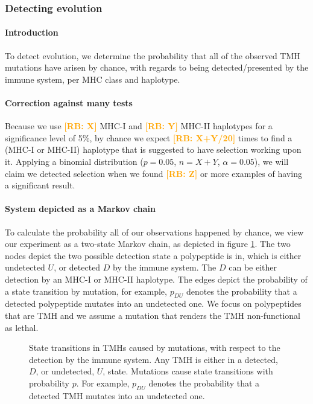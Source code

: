 \documentclass{article}
\newcommand{\richel}[1]{\textcolor{orange}{\textbf{[RB: #1]}}}
\begin{document}
\subsubsection{Detecting evolution}

\paragraph{Introduction}

To detect evolution, we determine the probability 
that all of the observed TMH mutations have arisen by chance,
with regards to being detected/presented by the immune system,
per MHC class and haplotype.

\paragraph{Correction against many tests}

Because we use \richel{X} MHC-I and \richel{Y} MHC-II haplotypes
for a significance level of 5\%, by chance we expect \richel{X+Y/20}
times to find a (MHC-I or MHC-II) haplotype 
that is suggested to have selection working 
upon it. Applying a binomial distribution ($p = 0.05$, $n = X+Y$, $\alpha = 0.05$),
we will claim we detected selection when we found \richel{Z} or
more examples of having a significant result. 

\paragraph{System depicted as a Markov chain}
 
To calculate the probability all of our observations happened by chance,
we view our experiment as a two-state Markov chain, as depicted in
figure \ref{fig:markov_chain}. The two nodes depict the
two possible detection state a polypeptide is in, which is
either undetected $U$, or detected $D$ by the immune system.
The $D$ can be either detection by an MHC-I or MHC-II haplotype.
The edges depict the probability of a state transition by mutation,
for example, $p_{DU}$ denotes the probability that a detected
polypeptide mutates into an undetected one.
We focus on polypeptides that are TMH and we assume a mutation that 
renders the TMH non-functional as lethal.

\begin{figure}
  \centering
  
  \caption{
    State transitions in TMHs caused by mutations, with respect to the
    detection by the immune system. Any TMH is either in a detected, $D$, or
    undetected, $U$, state. Mutations cause state transitions with probability
    $p$. For example, $p_{DU}$ denotes the probability that a detected
    TMH mutates into an undetected one.
  }
  \label{fig:markov_chain}
\end{figure}
\end{document}
